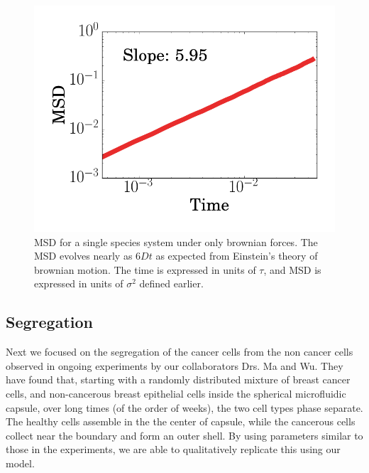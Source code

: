 \documentclass[aps,prb,twocolumn,groupedaddress,nofootinbib,floatfix]{revtex4}
\begin{document}
\begin{figure}
  \includegraphics[width=\columnwidth]{images/brownianMSD.png}
  \caption[brownianMSD]
    {MSD for a single species system under only brownian forces. The MSD evolves nearly as $6Dt$ as expected from Einstein's theory of brownian motion. The time is expressed in units of $\tau$, and MSD is expressed
    in units of $\sigma^2$ defined earlier.}
  \label{fig:brownianMSD}
\end{figure}

\subsection{Segregation}

Next we focused on the segregation of the cancer cells from the non cancer cells
observed in ongoing experiments by our collaborators Drs. Ma and Wu. 
They have found that, starting with a randomly distributed mixture of breast cancer cells,
and non-cancerous breast epithelial cells inside the spherical microfluidic capsule, over long times
(of the order of weeks), the two cell types phase separate. The healthy cells assemble in the the center of capsule,
while the cancerous cells collect near the boundary and form an outer shell. By using parameters similar to those 
in the experiments, we are able to qualitatively replicate this using our model.
\end{document}
